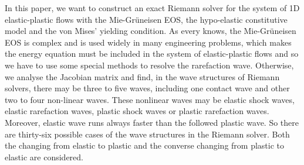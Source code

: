 \documentclass{article}
\numberwithin{equation}{section}
\numberwithin{table}{section}
\begin{document}

In this paper, we want to construct an exact Riemann solver for the system of 1D elastic-plastic flows with the Mie-Gr\"uneisen EOS, the hypo-elastic constitutive model and the von Mises' yielding condition. As every knows, the Mie-Gr\"uneisen EOS is complex and is used widely  in many engineering problems, which makes the energy equation must be included in the system of elastic-plastic flows and so we have to use some special methods to resolve the rarefaction wave. Otherwise, we analyse the Jacobian matrix and find, in the wave structures of Riemann solvers, there may be three to five waves, including one contact wave and other two to four non-linear waves. These nonlinear waves may be elastic shock waves, elastic rarefaction waves,  plastic shock waves or plastic rarefaction waves. Moreover, elastic wave runs always faster than the followed plastic wave. So there are thirty-six possible cases of the wave structures in the Riemann solver. {\color{red} Both the  changing from elastic to plastic and  the converse changing from plastic to elastic are considered.}
\end{document}
